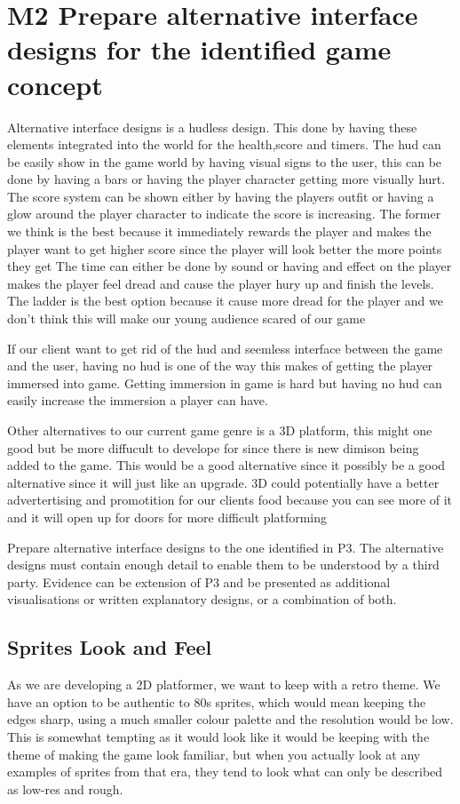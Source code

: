 \documentclass{article}
\begin{document}
\section{M2 Prepare alternative interface designs for the identified game concept}
Alternative interface designs is a hudless design. This done by having these elements integrated into the world for the health,score and timers. 
The hud can be easily show in the game world by having visual signs to the user, this can be done by having a bars or having the player character getting more visually hurt.
The score system can be shown either by having the players outfit or having a glow around the player character to indicate the score is increasing. The former we think is the best because it immediately rewards the player and makes the player want to get higher score since the player will look better the more points they get 
The time can either be done by sound or having and effect on the player makes the player feel dread and cause the player hury up and finish the levels. The ladder is the best option because it cause more dread for the player and we don't think this will make our young audience scared of our game

If our client want to get rid of the hud and seemless interface between the game and the user, having no hud is one of the way this makes of getting the player immersed into game. Getting immersion in game is hard but having no hud can easily increase the immersion a player can have.

Other alternatives to our current game genre is a 3D platform, this might one good but be more diffucult to develope for since there is new dimison being added to the game. This would be a good alternative since it possibly be a good alternative since it will just like an upgrade. 3D could potentially have a better advertertising and promotition for our clients food because you can see more of it and it will open up for doors for more difficult platforming

Prepare alternative interface designs to the one identified in P3. The alternative designs must contain enough detail to enable them to be understood by a third party. Evidence can be extension of P3 and be presented as additional visualisations or written explanatory designs, or a combination of both.


\subsection{ Sprites Look and Feel }
As we are developing a 2D platformer, we want to keep with a retro theme. We have an option to be authentic to 80s sprites, which would mean keeping the edges sharp, using a much smaller colour palette and the resolution would be low.
This is somewhat tempting as it would look like it would be keeping with the theme of making the game look familiar, but when you actually look at any examples of sprites from that era, they tend to look what can only be described as low-res and rough.
\end{document}

